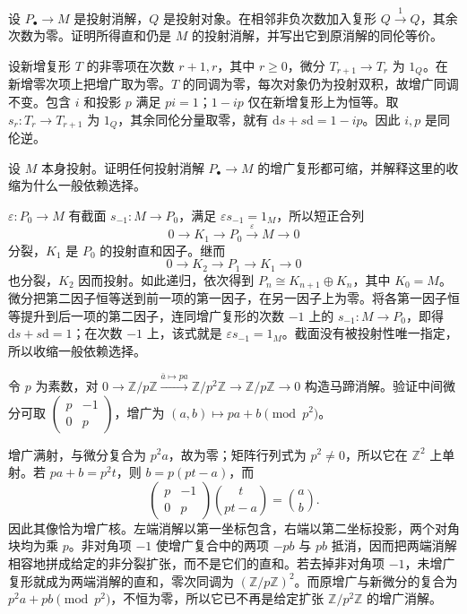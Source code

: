 \begin{exercise}\label{b4:ex:07-add-contractible}
	设 \(P_\bullet\to M\) 是投射消解，\(Q\) 是投射对象。在相邻非负次数加入复形 \(Q\xrightarrow1Q\)，其余次数为零。证明所得直和仍是 \(M\) 的投射消解，并写出它到原消解的同伦等价。
\end{exercise}
\begin{solution}
	设新增复形 \(T\) 的非零项在次数 \(r+1,r\)，其中 \(r\ge0\)，微分 \(T_{r+1}\to T_r\) 为 \(1_Q\)。在新增零次项上把增广取为零。\(T\) 的同调为零，每次对象仍为投射双积，故增广同调不变。包含 \(i\) 和投影 \(p\) 满足 \(pi=1\)；\(1-ip\) 仅在新增复形上为恒等。取 \(s_r:T_r\to T_{r+1}\) 为 \(1_Q\)，其余同伦分量取零，就有 \(\mathrm{d}s+s\mathrm{d}=1-ip\)。因此 \(i,p\) 是同伦逆。
\end{solution}

\begin{exercise}\label{b4:ex:07-projective-augmented-split}
	设 \(M\) 本身投射。证明任何投射消解 \(P_\bullet\to M\) 的增广复形都可缩，并解释这里的收缩为什么一般依赖选择。
\end{exercise}
\begin{solution}
	\(\varepsilon:P_0\to M\) 有截面 \(s_{-1}:M\to P_0\)，满足 \(\varepsilon s_{-1}=1_M\)，所以短正合列
	\[
		0\longrightarrow K_1\longrightarrow P_0\xrightarrow{\varepsilon}M\longrightarrow0
	\]
	分裂，\(K_1\) 是 \(P_0\) 的投射直和因子。继而
	\[
		0\longrightarrow K_2\longrightarrow P_1\longrightarrow K_1\longrightarrow0
	\]
	也分裂，\(K_2\) 因而投射。如此递归，依次得到 \(P_n\cong K_{n+1}\oplus K_n\)，其中 \(K_0=M\)。微分把第二因子恒等送到前一项的第一因子，在另一因子上为零。将各第一因子恒等提升到后一项的第二因子，连同增广复形的次数 \(-1\) 上的 \(s_{-1}:M\to P_0\)，即得 \(\mathrm{d}s+s\mathrm{d}=1\)；在次数 \(-1\) 上，该式就是 \(\varepsilon s_{-1}=1_M\)。截面没有被投射性唯一指定，所以收缩一般依赖选择。
\end{solution}

\begin{exercise}\label{b4:ex:07-horseshoe-p-square}
	令 \(p\) 为素数，对 \(0\to\mathbb Z/p\mathbb Z\xrightarrow{\bar a\mapsto p a}\mathbb Z/p^2\mathbb Z\to\mathbb Z/p\mathbb Z\to0\) 构造马蹄消解。验证中间微分可取 \(\begin{pmatrix}p&-1\\0&p\end{pmatrix}\)，增广为 \((a,b)\mapsto pa+b\pmod{p^2}\)。
\end{exercise}
\begin{solution}
	增广满射，与微分复合为 \(p^2a\)，故为零；矩阵行列式为 \(p^2\ne0\)，所以它在 \(\mathbb Z^2\) 上单射。若 \(pa+b=p^2t\)，则 \(b=p(pt-a)\)，而
	\[
		\begin{pmatrix}p&-1\\0&p\end{pmatrix}
		\binom{t}{pt-a}=\binom{a}{b}.
	\]
	因此其像恰为增广核。左端消解以第一坐标包含，右端以第二坐标投影，两个对角块均为乘 \(p\)。非对角项 \(-1\) 使增广复合中的两项 \(-pb\) 与 \(pb\) 抵消，因而把两端消解相容地拼成给定的非分裂扩张，而不是它们的直和。若去掉非对角项 \(-1\)，未增广复形就成为两端消解的直和，零次同调为 \((\mathbb Z/p\mathbb Z)^2\)。而原增广与新微分的复合为 \(p^2a+pb\pmod{p^2}\)，不恒为零，所以它已不再是给定扩张 \(\mathbb Z/p^2\mathbb Z\) 的增广消解。
\end{solution}

